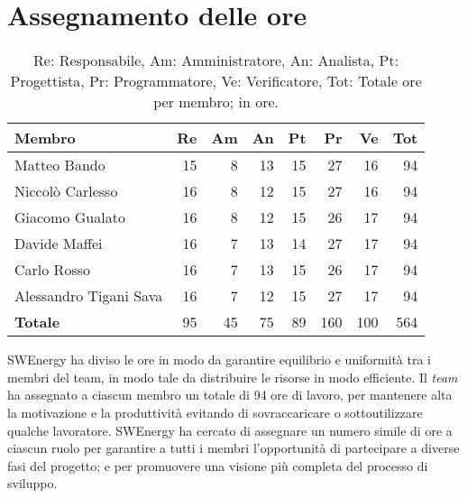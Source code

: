 \section{Assegnamento delle ore}

\begin{table}[H]
	\renewcommand{\arraystretch}{1.5}
	\centering
	\begin{tabular}{l|r|r|r|r|r|r|r}
		\textbf{Membro} & \textbf{Re} & \textbf{Am} & \textbf{An} & \textbf{Pt}
		& \textbf{Pr} & \textbf{Ve} & \textbf{Tot} \\
		\hline
		 Matteo Bando &				15 &  8 & 13 & 15 &  27 &  16 &  94	\\
		 Niccolò Carlesso &			16 &  8 & 12 & 15 &  27 &  16 &  94 \\
		 Giacomo Gualato &			16 &  8 & 12 & 15 &  26 &  17 &  94 \\
		 Davide Maffei	&			16 &  7 & 13 & 14 &  27 &  17 &  94 \\
		 Carlo Rosso &				16 &  7 & 13 & 15 &  26 &  17 &  94 \\
		 Alessandro Tigani Sava &	16 &  7 & 12 & 15 &  27 &  17 &  94 \\
		 \hline
		 \textbf{Totale} &			95 & 45 & 75 & 89 & 160 & 100 & 564 \\
	\end{tabular}

	\caption{Re: Responsabile, Am: Amministratore, An: Analista, Pt:
	Progettista, Pr: Programmatore, Ve: Verificatore, Tot: Totale ore per 
	membro; in ore.}
\end{table}

SWEnergy ha diviso le ore in modo da garantire equilibrio e uniformità tra i
membri del team, in modo tale da distribuire le risorse in modo efficiente.
Il \textit{team} ha assegnato a ciascun membro un totale di 94 ore di lavoro,
per mantenere alta la motivazione e la produttività evitando di sovraccaricare o
sottoutilizzare qualche lavoratore.
SWEnergy ha cercato di assegnare un numero simile di ore a ciascun ruolo per
garantire a tutti i membri l'opportunità di partecipare a diverse fasi del
progetto; e per promuovere una visione più completa del processo di sviluppo.
